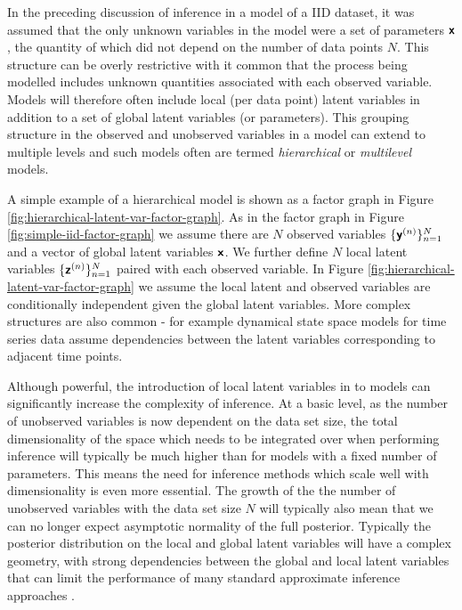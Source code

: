 In the preceding discussion of inference in a model of a \ac{IID} dataset, it was assumed that the only unknown variables in the model were a set of parameters $\boldsymbol{\mathsf{x}}$, the quantity of which did not depend on the number of data points $N$. This structure can be overly restrictive with it common that the process being modelled includes unknown quantities associated with each observed variable. Models will therefore  often include local (per data point) latent variables in addition to a set of global latent variables (or parameters). This grouping structure in the observed and unobserved variables in a model can extend to multiple levels and such models often are termed \emph{hierarchical} or \emph{multilevel} models.

A simple example of a hierarchical model is shown as a factor graph in Figure \ref{fig:hierarchical-latent-var-factor-graph}. As in the factor graph in Figure \ref{fig:simple-iid-factor-graph} we assume there are $N$ observed variables $\lbrace \boldsymbol{\mathsf{y}}^{(n)} \rbrace_{n=1}^N$ and a vector of global latent variables $\boldsymbol{\mathsf{x}}$. We further define $N$ local latent variables $\lbrace \boldsymbol{\mathsf{z}}^{(n)} \rbrace_{n=1}^N$ paired with each observed variable. In Figure \ref{fig:hierarchical-latent-var-factor-graph} we assume the local latent and observed variables are conditionally independent given the global latent variables. More complex structures are also common - for example dynamical state space models for time series data assume dependencies between the latent variables corresponding to adjacent time points. %

Although powerful, the introduction of local latent variables in to models can significantly increase the complexity of inference. At a basic level, as the number of unobserved variables is now dependent on the data set size, the total dimensionality of the space which needs to be integrated over when performing inference will typically be much higher than for models with a fixed number of parameters. This means the need for inference methods which scale well with dimensionality is even more essential. The growth of the the number of unobserved variables with the data set size $N$ will typically also mean that we can no longer expect asymptotic normality of the full posterior. Typically the posterior distribution on the local and global latent variables will have a complex geometry, with strong dependencies between the global and local latent variables that can limit the performance of many standard approximate inference approaches \citep{betancourt2015hamiltonian}.

